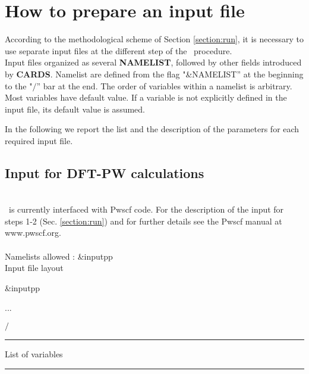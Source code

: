 
\thispagestyle{empty}
\section{How to prepare an input file}\label{section:input}

\noindent According to the methodological scheme of Section
\ref{section:run}, it is necessary to use separate input files at
the different step of the \WANT\ procedure.\\

\noindent Input files organized  as several {\bf NAMELIST},
followed by other fields introduced by {\bf CARDS}. Namelist are
defined from the  flag "\&NAMELIST'' at the beginning to the
"$/$'' bar at the end. The order of variables within a namelist is
arbitrary. Most variables have default value. If a variable is not
explicitly defined in the input file, its default value is
assumed.

\noindent In the following we report the list and the description
of the parameters for each required input file.

\subsection{Input for DFT-PW calculations}
\\
\noindent \WANT\ is currently interfaced with Pwscf code. For the
description of the input for steps 1-2 (Sec. \ref{section:run})
and for further details see the Pwscf manual at www.pwscf.org.\\

\\
\noindent Namelists allowed : \&inputpp\\
\noindent Input file layout
\begin{description}
  \item \&inputpp
  \item ...
  \item $/$
\end{description}
\begin{centering}
\rule{2.5in}{0.01in} List of variables \rule{2.5in}{0.01in}
\end{centering}\\

